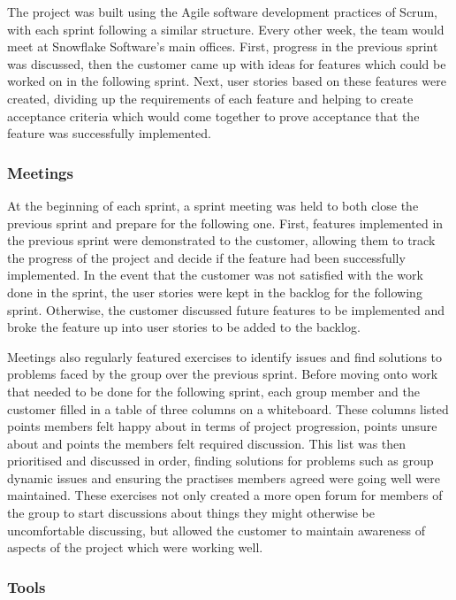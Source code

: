 \documentclass[a4paper, 12pt, twoside]{article}
\begin{document}
The project was built using the Agile software development practices of Scrum, with each sprint following a similar structure. Every other week, the team would meet at Snowflake Software's main offices. First, progress in the previous sprint was discussed, then the customer came up with ideas for features which could be worked on in the following sprint. Next, user stories based on these features were created, dividing up the requirements of each feature and helping to create acceptance criteria which would come together to prove acceptance that the feature was successfully implemented.

\subsubsection{Meetings}

At the beginning of each sprint, a sprint meeting was held to both close the previous sprint and prepare for the following one. First, features implemented in the previous sprint were demonstrated to the customer, allowing them to track the progress of the project and decide if the feature had been successfully implemented. In the event that the customer was not satisfied with the work done in the sprint, the user stories were kept in the backlog for the following sprint. Otherwise, the customer discussed future features to be implemented and broke the feature up into user stories to be added to the backlog.

Meetings also regularly featured exercises to identify issues and find solutions to problems faced by the group over the previous sprint. Before moving onto work that needed to be done for the following sprint, each group member and the customer filled in a table of three columns on a whiteboard. These columns listed points members felt happy about in terms of project progression, points unsure about and points the members felt required discussion. This list was then prioritised and discussed in order, finding solutions for problems such as group dynamic issues and ensuring the practises members agreed were going well were maintained. These exercises not only created a more open forum for members of the group to start discussions about things they might otherwise be uncomfortable discussing, but allowed the customer to maintain awareness of aspects of the project which were working well.

\subsubsection{Tools}
\end{document}
